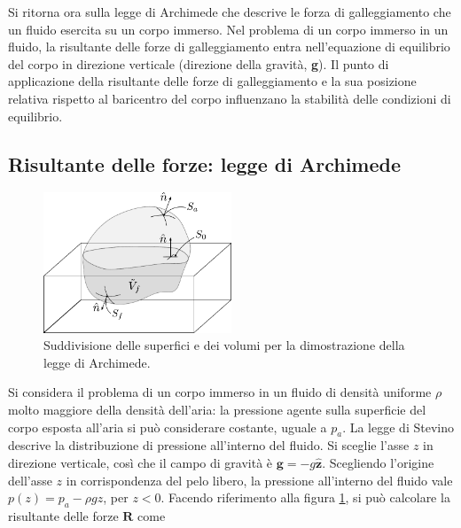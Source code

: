 \vspace{10pt}
Si ritorna ora sulla legge di Archimede che descrive le forza di galleggiamento che un fluido esercita su un corpo immerso. Nel problema di un corpo immerso in un fluido, la risultante delle forze di galleggiamento entra nell'equazione di equilibrio del corpo in direzione verticale (direzione della gravità, \textbf{g}). Il punto di applicazione della risultante delle forze di galleggiamento e la sua posizione relativa rispetto al baricentro del corpo influenzano la stabilità delle condizioni di equilibrio.

\subsection{Risultante delle forze: legge di Archimede}
%
\begin{figure}[t]
 \centering
 \includegraphics[width=0.5\textwidth]{./fig/archimede_01}
 \caption{Suddivisione delle superfici e dei volumi per la dimostrazione della legge di Archimede.}\label{fig:archimede_01}
\end{figure}
%
Si considera il problema di un corpo immerso in un fluido di densità uniforme $\rho$ molto maggiore della densità dell'aria: la pressione agente sulla superficie del corpo esposta all'aria si può considerare costante, uguale a $p_a$.
La legge di Stevino descrive la distribuzione di pressione all'interno del fluido. Si sceglie l'asse $z$ in direzione verticale, così che il campo di gravità è $\bm{g} = -g \bm{\hat{z}}$. Scegliendo l'origine dell'asse $z$ in corrispondenza del pelo libero, la pressione all'interno del fluido vale $p(z) = p_a - \rho g z$, per $z < 0$. Facendo riferimento alla figura \ref{fig:archimede_01}, si può calcolare la risultante delle forze $\bm{R}$ come
